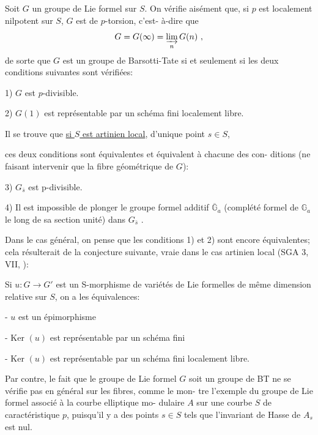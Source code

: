 \documentclass[11pt]{article}
\newcommand{\scanpage}[1]{\par\bigskip\noindent{\small\sffamily[scan #1]}\par}
\newcommand{\mspage}[1]{{\small\sffamily[p.\,#1]}}
\newcommand{\hand}[1]{\textcolor{blue}{#1}}
\newcommand{\uline}[1]{\underline{#1}}
\begin{document}
Soit $G$ un groupe de Lie formel sur $S$. On vérifie aisément
que, si $p$ est localement nilpotent sur $S$, $G$ est de $p$-torsion, c'est-%
à-dire que
\[
G = G(\infty) = \varinjlim_{n} G(n) \ ,
\]
de sorte que $G$ est un groupe de Barsotti-Tate si et seulement si les
deux conditions suivantes sont vérifiées:

1) $G$ est $p$-divisible.

2) $G(1)$ est représentable par un schéma fini localement libre.

Il se trouve que \uline{si $S$ est artinien local}, d'unique point $s \in S$,

\mspage{\hand{71}}

\clearpage
\scanpage{129/72}
\mspage{\uline{III}-17}

ces deux conditions sont équivalentes et équivalent à chacune des con-%
ditions (ne faisant intervenir que la fibre géométrique de $G$):

3) $G_{\bar{s}}$ est p-divisible.

4) Il est impossible de plonger le groupe formel additif $\overline{\mathbb{G}}_a$
(complété formel de $\mathbb{G}_a$ le long de sa section unité) dans $G_{\bar{s}}$ .

Dans le cas général, on pense que les conditions 1) et 2) sont
encore équivalentes; cela résulterait de la conjecture suivante, vraie
dans le cas artinien local (SGA 3, VII, \quad ):

Si $u\colon G \to G'$ est un S-morphisme de variétés de Lie formelles
de même dimension relative sur $S$, on a les équivalences:

- $u$ est un épimorphisme

- Ker $(u)$ est représentable par un schéma fini

- Ker $(u)$ est représentable par un schéma fini localement libre.

Par contre, le fait que le groupe de Lie formel $G$ soit un
groupe de BT ne se vérifie pas en général sur les fibres, comme le mon-%
tre l'exemple du groupe de Lie formel associé à la courbe elliptique mo-%
dulaire $A$ sur une courbe $S$ de caractéristique $p$, puisqu'il y a des
points $s \in S$ tels que l'invariant de Hasse de $A_s$ est nul.
\end{document}
